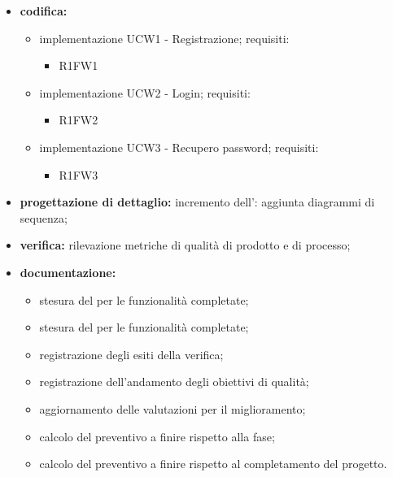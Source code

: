 \begin{itemize}
	\item \textbf{codifica:} 
			\begin{itemize}
				\item implementazione UCW1 - Registrazione; requisiti:
					\begin{itemize}
						\item R1FW1
					\end{itemize}
				\item implementazione UCW2 - Login; requisiti:
					\begin{itemize}
						\item R1FW2
					\end{itemize}
				\item implementazione UCW3 - Recupero password; requisiti:
					\begin{itemize}
						\item R1FW3
					\end{itemize}
			\end{itemize}
	\item \textbf{progettazione di dettaglio:} incremento dell’{\SA}: aggiunta diagrammi di sequenza;
 	\item \textbf{verifica:} rilevazione metriche di qualità di prodotto e di processo;
	\item \textbf{documentazione:} 
	 \begin{itemize}
		\item stesura del \MU{} per le funzionalità completate;
		\item stesura del \MA{} per le funzionalità completate;
  		\item registrazione degli esiti della verifica;
     	\item registrazione dell’andamento degli obiettivi di qualità;
		\item aggiornamento delle valutazioni per il miglioramento; 
		\item calcolo del preventivo a finire rispetto alla fase;
		\item calcolo del preventivo a finire rispetto al completamento del progetto.
	 \end{itemize}
\end{itemize}

\pagebreak

